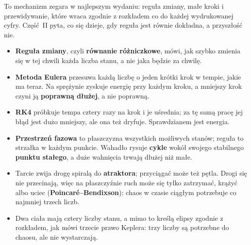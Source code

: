 \noindent
To mechanizm zegara w najlepszym wydaniu: reguła zmiany, małe kroki i
przewidywanie, które wraca zgodnie z rozkładem co do każdej wydrukowanej
cyfry. Część~II pyta, co się dzieje, gdy reguła jest równie dokładna, a
przyszłość nie.

\begin{summarybox}
\begin{itemize}
\item \textbf{Reguła zmiany}, czyli \textbf{równanie różniczkowe}, mówi, jak
  szybko zmienia się w tej chwili każda liczba stanu, a nie jaka będzie za
  chwilę.
\item \textbf{Metoda Eulera} przesuwa każdą liczbę o jeden krótki krok w
  tempie, jakie ma teraz. Na sprężynie zyskuje energię przy każdym kroku, a
  mniejszy krok czyni ją \textbf{poprawną dłużej}, a nie poprawną.
\item \textbf{RK4} próbkuje tempa cztery razy na krok i je uśrednia; za tę
  samą pracę jej błąd jest dużo mniejszy, ale ona też dryfuje. Sprawdzianem
  jest energia.
\item \textbf{Przestrzeń fazowa} to płaszczyzna wszystkich możliwych stanów;
  reguła to strzałka w każdym punkcie. Wahadło rysuje \textbf{cykle} wokół
  swojego stabilnego \textbf{punktu stałego}, a duże wahnięcia trwają dłużej
  niż małe.
\item Tarcie zwija drogę spiralą do \textbf{atraktora}; przyciągać może też
  pętla. Drogi się nie przecinają, więc na płaszczyźnie ruch może się tylko
  zatrzymać, krążyć albo uciec (\textbf{Poincaré--Bendixson}): chaos w czasie
  ciągłym potrzebuje co najmniej trzech liczb.
\item Dwa ciała mają cztery liczby stanu, a mimo to kreślą elipsy zgodnie z
  rozkładem, jak mówi trzecie prawo Keplera: trzy liczby są potrzebne do
  chaosu, ale nie wystarczają.
\end{itemize}
\end{summarybox}

\canyou

